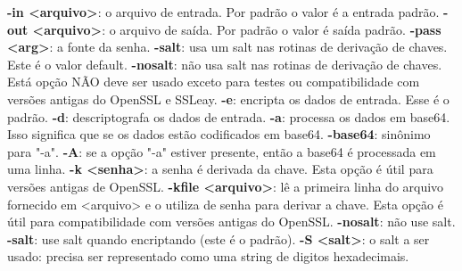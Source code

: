 \documentclass[a4paper,11pt]{article}
\theoremstyle{mytheor}
\begin{document}
\noindent \textbf{-in <arquivo>}: o arquivo de entrada. Por padrão o valor é a entrada padrão.
\newline\newline
\noindent \textbf{-out <arquivo>}: o arquivo de saída. Por padrão o valor é saída padrão.
\newline\newline
\noindent \textbf{-pass <arg>}: a fonte da senha.
\newline\newline
\noindent \textbf{-salt}: usa um salt nas rotinas de derivação de chaves. Este é o valor default.
\newline\newline
\noindent \textbf{-nosalt}: não usa salt nas rotinas de derivação de chaves. Está opção NÃO deve ser usado exceto para testes ou compatibilidade com versões antigas do OpenSSL e SSLeay.
\newline\newline
\noindent \textbf{-e}: encripta os dados de entrada. Esse é o padrão.
\newline\newline
\noindent \textbf{-d}: descriptografa os dados de entrada.
\newline\newline
\noindent \textbf{-a}: processa os dados em base64. Isso significa que se os dados estão codificados em base64.
\newline\newline
\noindent \textbf{-base64}: sinônimo para "-a".
\newline\newline
\noindent \textbf{-A}:  se a opção "-a" estiver presente, então a base64 é processada em uma linha.
\newline\newline
\noindent \textbf{-k <senha>}: a senha é derivada da chave. Esta opção é útil para versões antigas de OpenSSL. 
\newline\newline
\noindent \textbf{-kfile <arquivo>}: lê a primeira linha do arquivo fornecido em <arquivo> e o utiliza de senha para derivar a chave. Esta opção é útil para compatibilidade com versões antigas do OpenSSL.
\newline\newline
\noindent \textbf{-nosalt}: não use salt.
\newline\newline
\noindent \textbf{-salt}: use salt quando encriptando (este é o padrão).
\newline\newline
\noindent \textbf{-S <salt>}: o salt a ser usado: precisa ser representado como uma string de digitos hexadecimais.
\newline\newline
\end{document}
